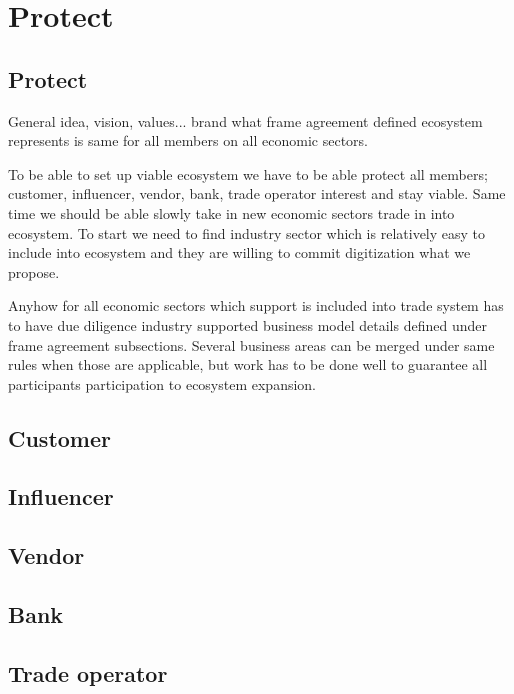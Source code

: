 %
%
%
\part{Protect}
\label{protect}
\chapter{Protect}
General idea, vision, values... brand what frame agreement defined ecosystem represents is same for all members on all economic sectors.


To be able to set up viable ecosystem we have to be able protect all members; customer, influencer, vendor, bank, trade operator interest and stay viable. Same time we should be able slowly take in new economic sectors trade in into ecosystem. To start we need to find industry sector which is relatively easy to include into ecosystem and they are willing to commit digitization what we propose.


Anyhow for all economic sectors which support is included into trade system has to have due diligence industry supported business model details defined under frame agreement subsections. Several business areas can be merged under same rules when those are applicable, but work has to be done well to guarantee all participants participation to ecosystem expansion.

\chapter{Customer}
\label{protect_customer}

\chapter{Influencer}
\label{protect_influencer}

\chapter{Vendor}
\label{protect_vendor}

\chapter{Bank}
\label{protect_bank}

\chapter{Trade operator}
\label{protect_trade_operatot}


